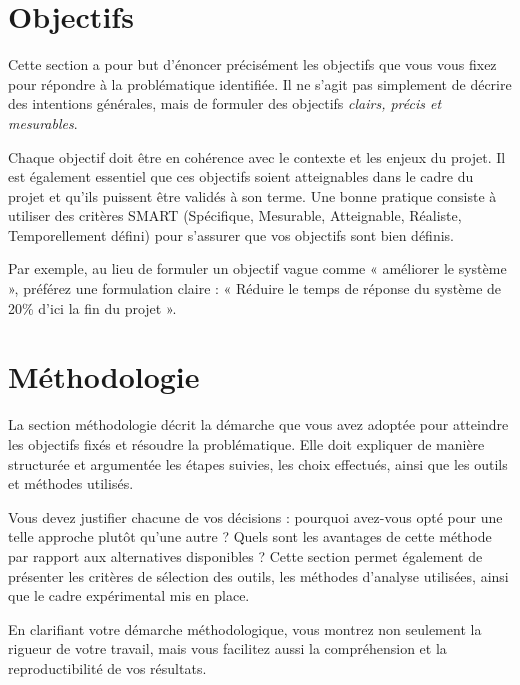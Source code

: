 \section{Objectifs}

Cette section a pour but d'énoncer précisément les objectifs que vous vous fixez pour répondre à la problématique identifiée. Il ne s'agit pas simplement de décrire des intentions générales, mais de formuler des objectifs \emph{clairs, précis et mesurables}.

Chaque objectif doit être en cohérence avec le contexte et les enjeux du projet. Il est également essentiel que ces objectifs soient atteignables dans le cadre du projet et qu'ils puissent être validés à son terme. Une bonne pratique consiste à utiliser des critères SMART (Spécifique, Mesurable, Atteignable, Réaliste, Temporellement défini) pour s'assurer que vos objectifs sont bien définis.

Par exemple, au lieu de formuler un objectif vague comme « améliorer le système », préférez une formulation claire : « Réduire le temps de réponse du système de 20\% d'ici la fin du projet ».

\section{Méthodologie}

La section méthodologie décrit la démarche que vous avez adoptée pour atteindre les objectifs fixés et résoudre la problématique. Elle doit expliquer de manière structurée et argumentée les étapes suivies, les choix effectués, ainsi que les outils et méthodes utilisés.

Vous devez justifier chacune de vos décisions : pourquoi avez-vous opté pour une telle approche plutôt qu'une autre ? Quels sont les avantages de cette méthode par rapport aux alternatives disponibles ? Cette section permet également de présenter les critères de sélection des outils, les méthodes d'analyse utilisées, ainsi que le cadre expérimental mis en place.

En clarifiant votre démarche méthodologique, vous montrez non seulement la rigueur de votre travail, mais vous facilitez aussi la compréhension et la reproductibilité de vos résultats.
